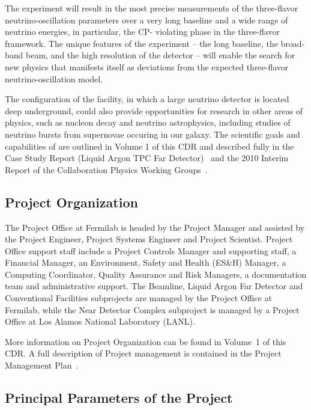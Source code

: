 The experiment will result in the most precise measurements of the three-flavor neutrino-oscillation 
parameters over a very long baseline and a wide range of neutrino energies, in particular, the CP-
violating phase in the three-flavor framework.  The unique features of the experiment -- the long 
baseline, the broad-band beam, and the high resolution of the detector -- will enable the search for new 
physics that manifests itself as deviations from the expected three-flavor neutrino-oscillation model.

The configuration of the
\expshort facility, in which a large neutrino detector is located deep underground, could also provide
opportunities for research in other areas of physics, such as nucleon decay and neutrino
astrophysics, including studies of neutrino bursts from supernovae occuring in our galaxy. The
scientific goals and capabilities of \expshort are outlined in Volume 1 of this CDR and described fully in 
the \expshort Case Study Report
(Liquid Argon TPC Far Detector)~\cite{caseStudy} and the 2010 Interim Report of
the \explong Collaboration Physics Working Groups~\cite{PWGIReport}.



\subsection{\expshort Project Organization}
The \expshort Project Office at Fermilab is headed by the Project Manager and assisted by the Project
Engineer, Project Systems Engineer and Project Scientist. Project Office support staff include a Project Controls Manager
and supporting staff, a Financial Manager, an Environment, Safety and Health (ES\&H) Manager, a Computing Coordinator, Quality Assurance and
Risk Managers, a documentation team and administrative support. 
The Beamline, Liquid Argon Far Detector and Conventional Facilities subprojects are managed by the 
Project Office at Fermilab, while the Near Detector Complex subproject is managed by a Project Office at Los Alamos National Laboratory (LANL).

More information on Project Organization can be found in Volume~1 of this CDR. A full description of \expshort 
Project management is contained in the \expshort Project Management Plan~\cite{PMP-2453}.

\subsection{Principal Parameters of the \expshort Project}

